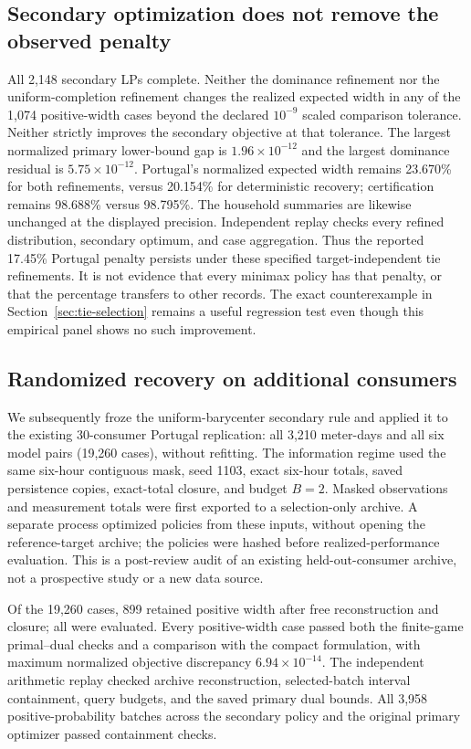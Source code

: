 \documentclass[12pt]{article}
\begin{document}
\subsection{Secondary optimization does not remove the observed penalty}
\label{sec:tie-results}
All 2,148 secondary LPs complete. Neither the dominance refinement nor the
uniform-completion refinement changes the realized expected width in any
of the 1,074 positive-width cases beyond the declared $10^{-9}$ scaled
comparison tolerance. Neither strictly improves the secondary objective at
that tolerance. The largest normalized primary lower-bound gap is
$1.96\times10^{-12}$ and the largest dominance residual is
$5.75\times10^{-12}$. Portugal's normalized expected width remains
23.670\% for both refinements, versus 20.154\% for deterministic recovery;
certification remains 98.688\% versus 98.795\%. The household summaries
are likewise unchanged at the displayed precision. Independent replay checks
every refined distribution, secondary optimum, and case aggregation.
Thus the reported 17.45\% Portugal penalty persists under these specified
target-independent tie refinements. It is not evidence that every minimax
policy has that penalty, or that the percentage transfers to other records.
The exact counterexample in Section~\ref{sec:tie-selection} remains a useful
regression test even though this empirical panel shows no such improvement.

\subsection{Randomized recovery on additional consumers}
We subsequently froze the uniform-barycenter secondary rule and applied it to the existing 30-consumer Portugal replication: all 3,210 meter-days and all six model pairs (19,260 cases), without refitting. The information regime used the same six-hour contiguous mask, seed 1103, exact six-hour totals, saved persistence copies, exact-total closure, and budget $B=2$. Masked observations and measurement totals were first exported to a selection-only archive. A separate process optimized policies from these inputs, without opening the reference-target archive; the policies were hashed before realized-performance evaluation. This is a post-review audit of an existing held-out-consumer archive, not a prospective study or a new data source.

Of the 19,260 cases, 899 retained positive width after free reconstruction and closure; all were evaluated. Every positive-width case passed both the finite-game primal--dual checks and a comparison with the compact formulation, with maximum normalized objective discrepancy $6.94\times10^{-14}$. The independent arithmetic replay checked archive reconstruction, selected-batch interval containment, query budgets, and the saved primary dual bounds. All 3,958 positive-probability batches across the secondary policy and the original primary optimizer passed containment checks.
\end{document}
